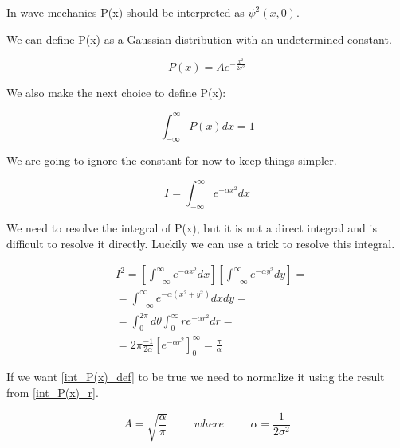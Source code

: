 In wave mechanics P(x) should be interpreted as $\psi^2(x,0)$.


We can define P(x) as a Gaussian distribution with an undetermined constant.

\begin{equation}
\label{P(x)_def}
    P(x) = A e^{-\frac{x^2}{2 \sigma^2}}
\end{equation}

We also make the next choice to define P(x):

\begin{equation}
\label{int_P(x)_def}
    \int_{-\infty}^{\infty}P(x) dx = 1
\end{equation}

We are going to ignore the constant for now to keep things simpler.

\begin{equation}
\label{int_P(x)_alpha}
    I = \int_{-\infty}^{\infty}e^{-\alpha x^2} dx 
\end{equation}


We need to resolve the integral of P(x), but it is not a direct integral and is difficult to resolve it directly. Luckily we can use a trick to resolve this integral.

\begin{equation}
\label{int_P(x)_r}
\begin{split}
    &I^2 = \left[\int_{-\infty}^{\infty}e^{-\alpha x^2} dx\right] \left[\int_{-\infty}^{\infty}e^{-\alpha y^2} dy\right] =\\
    & =  \int_{-\infty}^{\infty}e^{-\alpha(x^2+y^2)}dxdy = \\
    & =  \int_{0}^{2\pi}d\theta\int_{0}^{\infty}re^{-\alpha r^2}dr = \\
    & = 2\pi \frac{-1}{2\alpha} \left[ e^{-\alpha r^2} \right]_{0}^{\infty} = \frac{\pi}{\alpha}  
\end{split}
\end{equation}


If we want \ref{int_P(x)_def} to be true we need to normalize it using the result from \ref{int_P(x)_r}.

\begin{equation}
A = \sqrt{\frac{\alpha}{\pi}} \hspace{1cm} where \hspace{1cm} \alpha = \frac{1}{2\sigma^2}
\end{equation}

